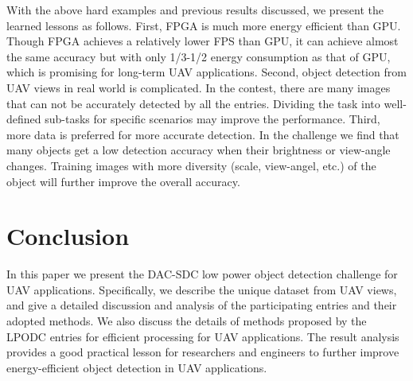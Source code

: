 \documentclass[10pt,journal,compsoc]{IEEEtran}
\begin{document}
With the above hard examples and previous results discussed, we present the learned lessons as follows.
First, FPGA is much more energy efficient than GPU.
Though FPGA achieves a relatively lower FPS than GPU,  it can achieve almost the same accuracy but with only 1/3-1/2 energy consumption as that of GPU, which is promising for long-term UAV applications.
Second, object detection from UAV views in real world is complicated.
In the contest, there are many images that can not be accurately detected by all the entries.
Dividing the task into well-defined sub-tasks for specific scenarios may improve the performance.
Third, more data is preferred for more accurate detection.
In the challenge we find that many objects get a low detection accuracy when their brightness or view-angle changes.
Training images with more diversity (scale, view-angel, etc.) of the object will further improve the overall accuracy.









\section{Conclusion}
In this paper we present the DAC-SDC low power object detection challenge for UAV applications.
Specifically, we describe the unique dataset from UAV views, and give a detailed discussion and analysis of the participating entries and their adopted methods.
We also discuss the details of methods proposed by the LPODC entries for efficient processing for UAV applications.
The result analysis provides a good practical lesson for researchers and engineers to further improve energy-efficient object detection in UAV applications.






%
\end{document}
